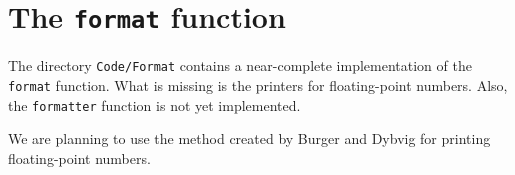 \chapter{The \texttt{format} function}

The directory \texttt{Code/Format} contains a near-complete
implementation of the \texttt{format} function.  What is missing is
the printers for floating-point numbers.  Also, the \texttt{formatter}
function is not yet implemented.

We are planning to use the method created by Burger and Dybvig
\cite{Burger:1996:PFN:231379.231397} for printing floating-point
numbers.
